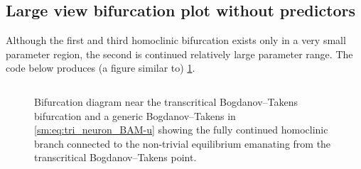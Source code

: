 \subsection{Large view bifurcation plot without predictors}
Although the first and third homoclinic bifurcation exists only in a very small
parameter region, the second is continued relatively large parameter range. The
code below produces (a figure similar to)
\cref{sm:fig:triNeuronBAMNeuralNetworkModelLargerBifurctionPlot}.
\inputminted[firstline=245, lastline=267]{MATLAB}{\pathToDDEBifToolDemos/BAM_neural_network_model/BAMnn.m}
\begin{figure}[ht]
    \caption{
    Bifurcation diagram near the transcritical Bogdanov--Takens bifurcation and
    a generic Bogdanov--Takens in \cref{sm:eq:tri_neuron_BAM-u} showing the fully
    continued homoclinic branch connected to the non-trivial equilibrium emanating
    from the transcritical Bogdanov--Takens point.}
    \label{sm:fig:triNeuronBAMNeuralNetworkModelLargerBifurctionPlot}
\end{figure}

